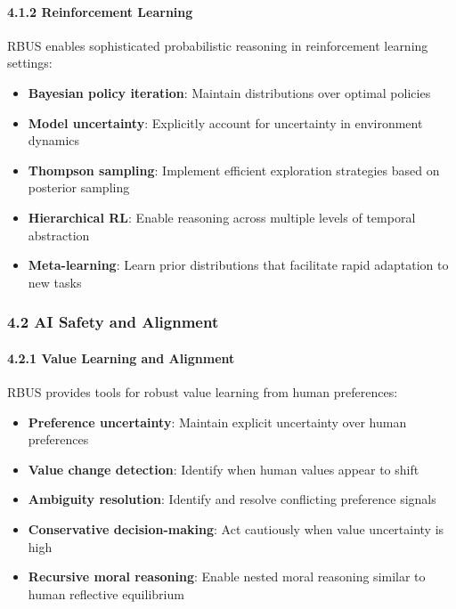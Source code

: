 \documentclass[
]{article}
\providecommand{\tightlist}{%
  \setlength{\itemsep}{0pt}\setlength{\parskip}{0pt}}
\begin{document}
\paragraph{4.1.2 Reinforcement Learning}\label{reinforcement-learning-1}

RBUS enables sophisticated probabilistic reasoning in reinforcement
learning settings:

\begin{itemize}
\tightlist
\item
  \textbf{Bayesian policy iteration}: Maintain distributions over
  optimal policies
\item
  \textbf{Model uncertainty}: Explicitly account for uncertainty in
  environment dynamics
\item
  \textbf{Thompson sampling}: Implement efficient exploration strategies
  based on posterior sampling
\item
  \textbf{Hierarchical RL}: Enable reasoning across multiple levels of
  temporal abstraction
\item
  \textbf{Meta-learning}: Learn prior distributions that facilitate
  rapid adaptation to new tasks
\end{itemize}

\subsubsection{4.2 AI Safety and
Alignment}\label{ai-safety-and-alignment-1}

\paragraph{4.2.1 Value Learning and
Alignment}\label{value-learning-and-alignment}

RBUS provides tools for robust value learning from human preferences:

\begin{itemize}
\tightlist
\item
  \textbf{Preference uncertainty}: Maintain explicit uncertainty over
  human preferences
\item
  \textbf{Value change detection}: Identify when human values appear to
  shift
\item
  \textbf{Ambiguity resolution}: Identify and resolve conflicting
  preference signals
\item
  \textbf{Conservative decision-making}: Act cautiously when value
  uncertainty is high
\item
  \textbf{Recursive moral reasoning}: Enable nested moral reasoning
  similar to human reflective equilibrium
\end{itemize}
\end{document}
